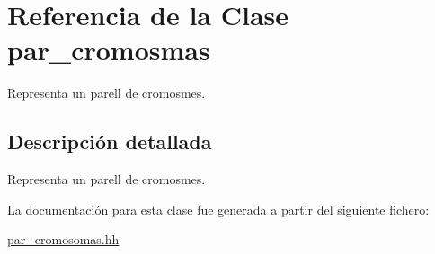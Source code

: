 \hypertarget{classpar__cromosmas}{}\section{Referencia de la Clase par\+\_\+cromosmas}
\label{classpar__cromosmas}


Representa un parell de cromosmes.  




\subsection{Descripción detallada}
Representa un parell de cromosmes. 

La documentación para esta clase fue generada a partir del siguiente fichero\+:\begin{DoxyCompactItemize}
\item 
\hyperlink{par__cromosomas_8hh}{par\+\_\+cromosomas.\+hh}\end{DoxyCompactItemize}
